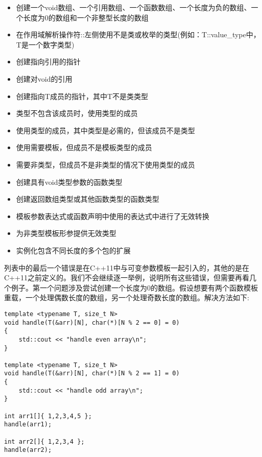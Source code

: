 \begin{itemize}
\item
创建一个void数组、一个引用数组、一个函数数组、一个长度为负的数组、一个长度为0的数组和一个非整型长度的数组

\item
在作用域解析操作符::左侧使用不是类或枚举的类型(例如：T::value\_type中，T是一个数字类型)

\item
创建指向引用的指针

\item
创建对void的引用

\item
创建指向T成员的指针，其中T不是类类型

\item
类型不包含该成员时，使用类型的成员

\item
使用类型的成员，其中类型是必需的，但该成员不是类型

\item
使用需要模板，但成员不是模板类型的成员

\item
需要非类型，但成员不是非类型的情况下使用类型的成员

\item
创建具有void类型参数的函数类型

\item
创建返回数组类型或其他函数类型的函数类型

\item
模板参数表达式或函数声明中使用的表达式中进行了无效转换

\item
为非类型模板形参提供无效类型

\item
实例化包含不同长度的多个包的扩展
\end{itemize}

列表中的最后一个错误是在C++11中与可变参数模板一起引入的，其他的是在C++11之前定义的。我们不会继续逐一举例，说明所有这些错误，但需要再看几个例子。第一个问题涉及尝试创建一个长度为0的数组。假设想要有两个函数模板重载，一个处理偶数长度的数组，另一个处理奇数长度的数组。解决方法如下:

\begin{lstlisting}[style=styleCXX]
template <typename T, size_t N>
void handle(T(&arr)[N], char(*)[N % 2 == 0] = 0)
{
	std::cout << "handle even array\n";
}

template <typename T, size_t N>
void handle(T(&arr)[N], char(*)[N % 2 == 1] = 0)
{
	std::cout << "handle odd array\n";
}

int arr1[]{ 1,2,3,4,5 };
handle(arr1);

int arr2[]{ 1,2,3,4 };
handle(arr2);
\end{lstlisting}

